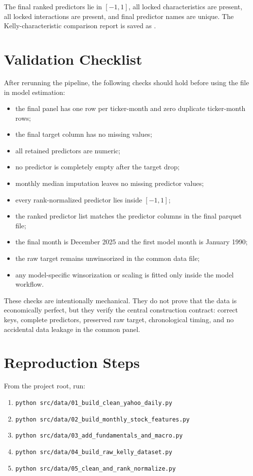 \documentclass[11pt,a4paper]{article}
\newcommand{\code}[1]{\texttt{#1}}
\begin{document}
The final ranked predictors lie in $[-1,1]$, all locked characteristics are present, all locked interactions are present, and final predictor names are unique. The Kelly-characteristic comparison report is saved as .

\section{Validation Checklist}

After rerunning the pipeline, the following checks should hold before using the file in model estimation:
\begin{itemize}
  \item the final panel has one row per ticker-month and zero duplicate ticker-month rows;
  \item the final target column has no missing values;
  \item all retained predictors are numeric;
  \item no predictor is completely empty after the target drop;
  \item monthly median imputation leaves no missing predictor values;
  \item every rank-normalized predictor lies inside $[-1,1]$;
  \item the ranked predictor list matches the predictor columns in the final parquet file;
  \item the final month is December 2025 and the first model month is January 1990;
  \item the raw target remains unwinsorized in the common data file;
  \item any model-specific winsorization or scaling is fitted only inside the model workflow.
\end{itemize}

These checks are intentionally mechanical. They do not prove that the data is economically perfect, but they verify the central construction contract: correct keys, complete predictors, preserved raw target, chronological timing, and no accidental data leakage in the common panel.

\section{Reproduction Steps}

From the project root, run:
\begin{enumerate}
  \item \code{python src/data/01\_build\_clean\_yahoo\_daily.py}
  \item \code{python src/data/02\_build\_monthly\_stock\_features.py}
  \item \code{python src/data/03\_add\_fundamentals\_and\_macro.py}
  \item \code{python src/data/04\_build\_raw\_kelly\_dataset.py}
  \item \code{python src/data/05\_clean\_and\_rank\_normalize.py}
\end{enumerate}
\end{document}
